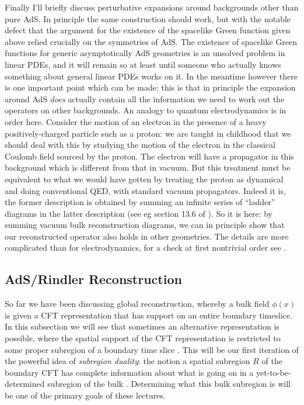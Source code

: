 \documentclass[toc]{PoS}
\begin{document}
Finally I'll briefly discuss perturbative expansions around backgrounds other than pure AdS.  In principle the same construction should work, but with the notable defect that the argument for the existence of the spacelike Green function given above relied crucially on the symmetries of AdS.  The existence of spacelike Green functions for generic asymptotically AdS geometries is an unsolved problem in linear PDEs, and it will remain so at least until someone who actually knows something about general linear PDEs works on it.  In the meantime however there is one important point which can be made: this is that in principle the expansion around AdS \textit{does} actually contain all the information we need to work out the operators on other backgrounds.  An analogy to quantum electrodynamics is in order here. Consider the motion of an electron in the presence of a heavy positively-charged particle such as a proton: we are taught in childhood that we should deal with this by studying the motion of the electron in the classical Coulomb field sourced by the proton.  The electron will have a propagator in this background which is different from that in vacuum.  But this treatment must be equivalent to what we would have gotten by treating the proton as dynamical and doing conventional QED, with standard vacuum propagators.  Indeed it is, the former description is obtained by summing an infinite series of ``ladder'' diagrams in the latter description (see eg section 13.6 of \cite{Weinberg:1995mt}).  So it is here: by summing vacuum bulk reconstruction diagrams, we can in principle show that our reconstructed operator also holds in other geometries.  The details are more complicated than for electrodynamics, for a check at first nontrivial order see \cite{Duff:1973zz}.

\subsection{AdS/Rindler Reconstruction}
So far we have been discussing global reconstruction, whereby a bulk field $\phi(x)$ is given a CFT representation that has support on an entire boundary timeslice.  In this subsection we will see that sometimes an alternative representation is possible, where the spatial support of the CFT representation is restricted to some proper subregion of a boundary time slice \cite{Hamilton:2006az,Morrison:2014jha}.  This will be our first iteration of the powerful idea of \textit{subregion duality}: the notion a spatial subregion $R$ of the boundary CFT has complete information about what is going on in a yet-to-be-determined subregion of the bulk \cite{Bousso:2012sj,Czech:2012bh,Bousso:2012mh}.  Determining what this bulk subregion is will be one of the primary goals of these lectures.  
\end{document}
